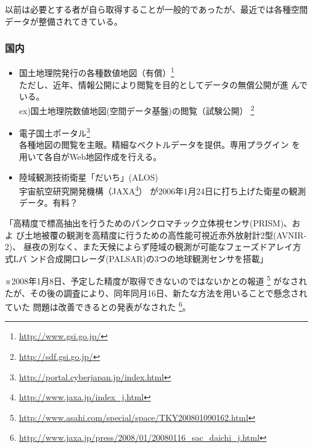 \documentclass[mingoth,a4paper]{jsarticle}
\begin{document}
以前は必要とする者が自ら取得することが一般的であったが、最近では各種空間
データが整備されてきている。

\subsubsection{国内}
\begin{itemize}
 \item 国土地理院発行の各種数値地図（有償）\footnote{\url{http://www.gsi.go.jp/}}\\
       ただし、近年、情報公開により閲覧を目的としてデータの無償公開が進
       んでいる。\\
       ex)国土地理院数値地図(空間データ基盤)の閲覧（試験公開）
       \footnote{\url{http://sdf.gsi.go.jp/}}
 \item 電子国土ポータル\footnote{\url{http://portal.cyberjapan.jp/index.html}}\\
       各種地図の閲覧を主眼。精細なベクトルデータを提供。専用プラグイン
       を用いて各自がWeb地図作成を行える。
 \item 陸域観測技術衛星「だいち」(ALOS)\\
       宇宙航空研究開発機構（JAXA\footnote{\url{http://www.jaxa.jp/index_j.html}}）
       が2006年1月24日に打ち上げた衛星の観測データ。有料？
\end{itemize}

「高精度で標高抽出を行うためのパンクロマチック立体視センサ(PRISM)、およ
び土地被覆の観測を高精度に行うための高性能可視近赤外放射計2型(AVNIR-2)、
昼夜の別なく、また天候によらず陸域の観測が可能なフェーズドアレイ方式Lバ
ンド合成開口レーダ(PALSAR)の3つの地球観測センサを搭載」

※2008年1月8日、予定した精度が取得できないのではないかとの報道
\footnote{\url{http://www.asahi.com/special/space/TKY200801090162.html}}
がなされたが、その後の調査により、同年同月16日、新たな方法を用いることで懸念されていた
問題は改善できるとの発表がなされた
\footnote{\url{http://www.jaxa.jp/press/2008/01/20080116_sac_daichi_j.html}}。
\end{document}
